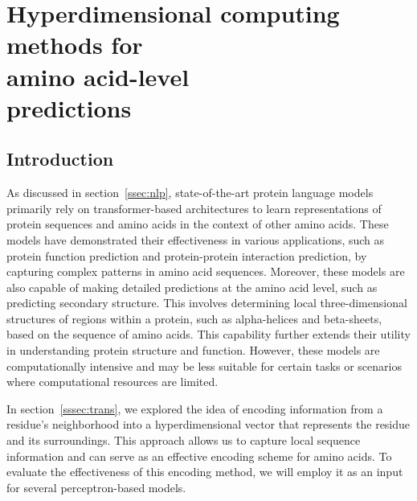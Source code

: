 \chapter[Methods for amino acid-level predictions]{Hyperdimensional computing methods for\\amino acid-level\\predictions}
\section{Introduction}
As discussed in section~\ref{ssec:nlp}, state-of-the-art protein language models primarily rely on transformer-based architectures to learn representations of protein sequences and amino acids in the context of other amino acids. These models have demonstrated their effectiveness in various applications, such as protein function prediction and protein-protein interaction prediction, by capturing complex patterns in amino acid sequences. Moreover, these models are also capable of making detailed predictions at the amino acid level, such as predicting secondary structure. This involves determining local three-dimensional structures of regions within a protein, such as alpha-helices and beta-sheets, based on the sequence of amino acids. This capability further extends their utility in understanding protein structure and function. However, these models are computationally intensive and may be less suitable for certain tasks or scenarios where computational resources are limited.

In section~\ref{sssec:trans}, we explored the idea of encoding information from a residue's neighborhood into a hyperdimensional vector that represents the residue and its surroundings. This approach allows us to capture local sequence information and can serve as an effective encoding scheme for amino acids. To evaluate the effectiveness of this encoding method, we will employ it as an input for several perceptron-based models.


